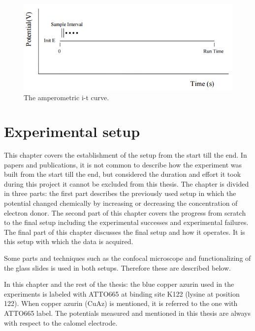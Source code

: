 \documentclass[twoside,single]{lion-msc}
\begin{document}
\begin{figure}[ht!]
\centering
\includegraphics[width= \textwidth]{amp_curve}
\caption{The amperometric i-t curve. } 
\label{amp_curve}
\end{figure}


\chapter{Experimental setup}

This chapter covers the establishment of the setup from the start till the end. In papers and publications, it is not  common to describe how the experiment was built from the start till the end, but considered the duration and effort it took during this project it cannot be excluded from this thesis. The chapter is divided in three parts: the first part describes the previously used setup in which the potential changed chemically by increasing or decreasing the concentration of  electron donor. The second part of this chapter covers the progress from scratch to the final setup including the experimental successes and experimental failures. The final part of this chapter discusses the final setup and how it operates. It is this setup with which the data is acquired.

Some parts and techniques such as the confocal microscope and functionalizing of the glass slides is used in both setups. Therefore these are described below.

In this chapter and the rest of the thesis: the blue copper azurin used in the experiments is  labeled with ATTO665 at binding site K122 (lysine at position 122). When copper azurin (CuAz) is mentioned, it is referred to the one with ATTO665 label.
The potentials measured and mentioned in this thesis are always with respect to the calomel electrode.
\end{document}
